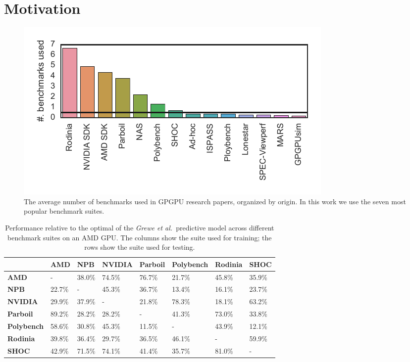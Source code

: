 \section{Motivation}\label{subsec:motivation}

\begin{figure}[t]
  \includegraphics[width=\columnwidth]{img/motivation-c} %
  \caption{%
  The average number of benchmarks used in GPGPU research papers, organized by
  origin. In this work we use the seven most popular benchmark suites.%
  }%
  \label{fig:benchmark-suite-distribution}
\end{figure}

\begin{table}
  \scriptsize%
  \centering%
  \begin{tabular}{ R{1.5cm} C{1.5cm} C{1.5cm} C{1.5cm} C{1.5cm} C{1.5cm} C{1.5cm} C{1.5cm} }
    \toprule
    & \textbf{AMD} & \textbf{NPB} & \textbf{NVIDIA} & \textbf{Parboil} & \textbf{Polybench} & \textbf{Rodinia} & \textbf{SHOC}\\
    \midrule
    \textbf{AMD} & - & 38.0\% & 74.5\% & 76.7\% & 21.7\% & 45.8\% & 35.9\%\\
    \textbf{NPB} & 22.7\% & - & 45.3\% & 36.7\% & 13.4\% & 16.1\% & 23.7\%\\
    \textbf{NVIDIA} & 29.9\% & 37.9\% & - & 21.8\% & 78.3\% & 18.1\% & 63.2\%\\
    \textbf{Parboil} & 89.2\% & 28.2\% & 28.2\% & - & 41.3\% & 73.0\% & 33.8\%\\
    \textbf{Polybench} & 58.6\% & 30.8\% & 45.3\% & 11.5\% & - & 43.9\% & 12.1\%\\
    \textbf{Rodinia} & 39.8\% & 36.4\% & 29.7\% & 36.5\% & 46.1\% & - & 59.9\%\\
    \textbf{SHOC} & 42.9\% & 71.5\% & 74.1\% & 41.4\% & 35.7\% & 81.0\% & -\\
  \end{tabular}
  \caption{Performance relative to the optimal of the \emph{Grewe et al.\ }predictive model across different benchmark suites on an AMD GPU. The columns show the suite used for training; the rows show the suite used for testing.}%
  \label{tab:benchmark-xval}
\end{table}

